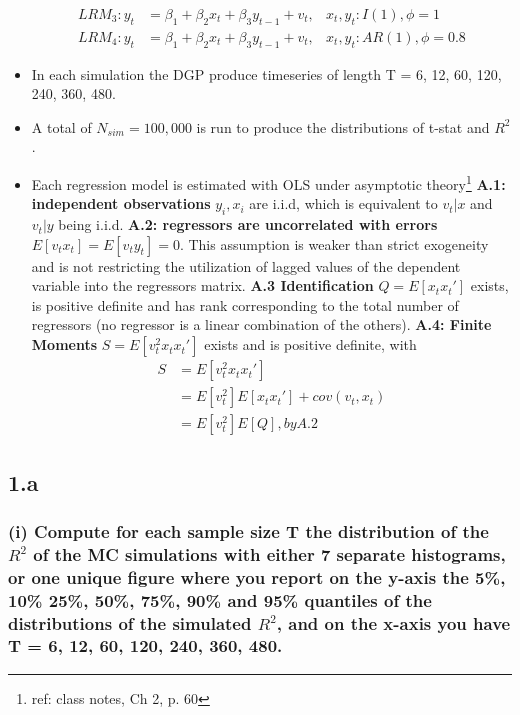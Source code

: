 \documentclass[]{article}
\begin{document}
\begin{itemize}
\begin{align*}
		LRM_3: y_{t} &= \beta_{1} +\beta_{2}x_{t} + \beta_{3}y_{t-1} + v_{t}, &x_t, y_t: I(1), \phi=1\\
		LRM_4: y_{t} &= \beta_{1} +\beta_{2}x_{t} + \beta_{3}y_{t-1} + v_{t}, &x_t, y_t: AR(1), \phi=0.8
	\end{align*}	
	\item In each simulation the DGP produce timeseries of length T = 6, 12, 60, 120, 240, 360, 480.
	\item A total of $N_{sim} = 100,000$ is run to produce the distributions of t-stat and $R^2$.
	\item Each regression model is estimated with OLS under asymptotic theory\footnote{ref: class notes, Ch 2, p. 60}
	\subitem \textbf{A.1: independent observations} $y_i, x_i$ are i.i.d, which is equivalent to $v_t|x$ and $v_t|y$ being i.i.d.
	\subitem \textbf{A.2: regressors are uncorrelated with errors} $E[v_t x_t]=E[v_t y_t]=0$. This assumption is weaker than strict exogeneity and is not restricting the utilization of lagged values of the dependent variable into the regressors matrix.
	\subitem \textbf{A.3 Identification} $Q= E[x_{t}x_{t}']$ exists, is positive definite and has rank corresponding to the total number of regressors (no regressor is a linear combination of the others).
	\subitem \textbf{A.4: Finite Moments } $S = E[v_{t}^2x_{t}x_{t}']$ exists and is positive definite, with 
		\begin{align*}
			S &= E[v_{t}^2x_{t}x_{t}']\\
			&= E[v_t^2]E[x_tx_t']+cov(v_t,x_t)\\
			&= E[v_t^2]E[Q], by A.2
		\end{align*}
\end{itemize}

\newpage
\subsection*{1.a}
\subsubsection*{(i) Compute for each sample size T the distribution of the $R^2$ of the MC simulations with either 7 separate histograms, or one unique figure where you report on the y-axis the 5\%, 10\% 25\%, 50\%, 75\%, 90\% and 95\% quantiles of the distributions of the simulated $R^2$, and on the x-axis you have T = 6, 12, 60, 120, 240, 360, 480.}
\end{document}
